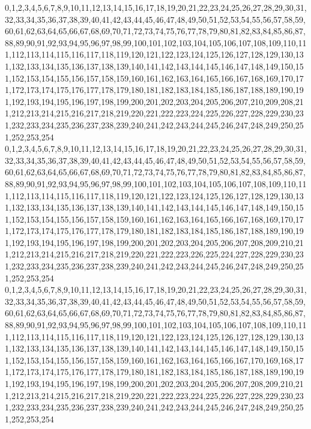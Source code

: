 \documentclass[12pt]{article}
\begin{document}
{0,1,2,3,4,5,6,7,8,9,10,11,12,13,14,15,16,17,18,19,20,21,22,23,24,25,26,27,28,29,30,31,32,33,34,35,36,37,38,39,40,41,42,43,44,45,46,47,48,49,50,51,52,53,54,55,56,57,58,59,60,61,62,63,64,65,66,67,68,69,70,71,72,73,74,75,76,77,78,79,80,81,82,83,84,85,86,87,88,89,90,91,92,93,94,95,96,97,98,99,100,101,102,103,104,105,106,107,108,109,110,111,112,113,114,115,116,117,118,119,120,121,122,123,124,125,126,127,128,129,130,131,132,133,134,135,136,137,138,139,140,141,142,143,144,145,146,147,148,149,150,151,152,153,154,155,156,157,158,159,160,161,162,163,164,165,166,167,168,169,170,171,172,173,174,175,176,177,178,179,180,181,182,183,184,185,186,187,188,189,190,191,192,193,194,195,196,197,198,199,200,201,202,203,204,205,206,207,210,209,208,211,212,213,214,215,216,217,218,219,220,221,222,223,224,225,226,227,228,229,230,231,232,233,234,235,236,237,238,239,240,241,242,243,244,245,246,247,248,249,250,251,252,253,254\\
0,1,2,3,4,5,6,7,8,9,10,11,12,13,14,15,16,17,18,19,20,21,22,23,24,25,26,27,28,29,30,31,32,33,34,35,36,37,38,39,40,41,42,43,44,45,46,47,48,49,50,51,52,53,54,55,56,57,58,59,60,61,62,63,64,65,66,67,68,69,70,71,72,73,74,75,76,77,78,79,80,81,82,83,84,85,86,87,88,89,90,91,92,93,94,95,96,97,98,99,100,101,102,103,104,105,106,107,108,109,110,111,112,113,114,115,116,117,118,119,120,121,122,123,124,125,126,127,128,129,130,131,132,133,134,135,136,137,138,139,140,141,142,143,144,145,146,147,148,149,150,151,152,153,154,155,156,157,158,159,160,161,162,163,164,165,166,167,168,169,170,171,172,173,174,175,176,177,178,179,180,181,182,183,184,185,186,187,188,189,190,191,192,193,194,195,196,197,198,199,200,201,202,203,204,205,206,207,208,209,210,211,212,213,214,215,216,217,218,219,220,221,222,223,226,225,224,227,228,229,230,231,232,233,234,235,236,237,238,239,240,241,242,243,244,245,246,247,248,249,250,251,252,253,254\\
0,1,2,3,4,5,6,7,8,9,10,11,12,13,14,15,16,17,18,19,20,21,22,23,24,25,26,27,28,29,30,31,32,33,34,35,36,37,38,39,40,41,42,43,44,45,46,47,48,49,50,51,52,53,54,55,56,57,58,59,60,61,62,63,64,65,66,67,68,69,70,71,72,73,74,75,76,77,78,79,80,81,82,83,84,85,86,87,88,89,90,91,92,93,94,95,96,97,98,99,100,101,102,103,104,105,106,107,108,109,110,111,112,113,114,115,116,117,118,119,120,121,122,123,124,125,126,127,128,129,130,131,132,133,134,135,136,137,138,139,140,141,142,143,144,145,146,147,148,149,150,151,152,153,154,155,156,157,158,159,160,161,162,163,164,165,166,167,170,169,168,171,172,173,174,175,176,177,178,179,180,181,182,183,184,185,186,187,188,189,190,191,192,193,194,195,196,197,198,199,200,201,202,203,204,205,206,207,208,209,210,211,212,213,214,215,216,217,218,219,220,221,222,223,224,225,226,227,228,229,230,231,232,233,234,235,236,237,238,239,240,241,242,243,244,245,246,247,248,249,250,251,252,253,254\\
}
\end{document}
